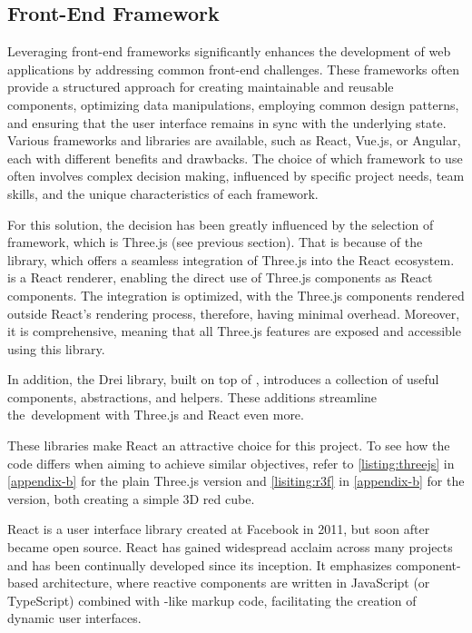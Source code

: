 \subsection{Front-End Framework}

Leveraging front-end frameworks significantly enhances the development of web applications by addressing common front-end challenges. These frameworks often provide a structured approach for creating maintainable and reusable components, optimizing data manipulations, employing common design patterns, and ensuring that the user interface remains in sync with the underlying state. Various frameworks and libraries are available, such as React, Vue.js, or Angular, each with different benefits and drawbacks. The choice of which framework to use often involves complex decision making, influenced by specific project needs, team skills, and the unique characteristics of each framework.~\cite{Gimeno2018, Pekarsky2020}

For this solution, the decision has been greatly influenced by the selection of  framework, which is Three.js (see previous section). That is because of the  library, which offers a seamless integration of Three.js into the React ecosystem.  is a React renderer, enabling the direct use of Three.js components as React components. The integration is optimized, with the Three.js components rendered outside React's rendering process, therefore, having minimal overhead. Moreover, it is comprehensive, meaning that all Three.js features are exposed and accessible using this library.~\cite{R3F}

In addition, the Drei library, built on top of , introduces a collection of useful components, abstractions, and helpers. These additions streamline the~development with Three.js and React even more.~\cite{Drei}

These libraries make React an attractive choice for this project. To see how the code differs when aiming to achieve similar objectives, refer to \autoref{listing:threejs} in \autoref{appendix-b} for the plain Three.js version and \autoref{lisiting:r3f} in \autoref{appendix-b} for the  version, both creating a simple 3D red cube.

React is a user interface library created at Facebook in 2011, but soon after became open source. React has gained widespread acclaim across many projects and has been continually developed since its inception. It emphasizes component-based architecture, where reactive components are written in JavaScript (or TypeScript) combined with -like markup code, facilitating the creation of dynamic user interfaces.~\cite{Banks2020}

